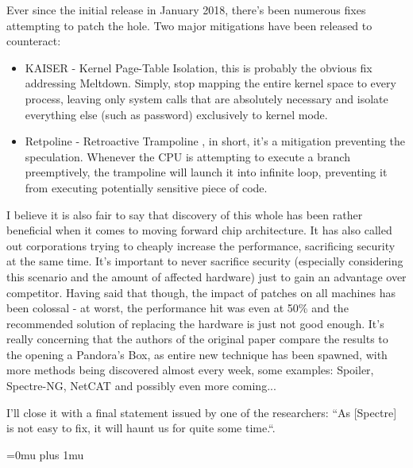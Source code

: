 \documentclass{article}
\begin{document}
Ever since the initial release in January 2018, there's been numerous fixes attempting to patch the hole. Two major mitigations have been released to counteract:
\begin{itemize}
  \item KAISER \cite{lipp2018meltdown} - Kernel Page-Table Isolation, this is probably the obvious fix addressing Meltdown. Simply, stop mapping the entire kernel space to every process, leaving only system calls that are absolutely necessary and isolate everything else (such as password) exclusively to kernel mode.
  \item Retpoline - Retroactive Trampoline \cite{turner2018retpoline}, in short, it's a mitigation preventing the speculation. Whenever the CPU is attempting to execute a branch preemptively, the trampoline will launch it into infinite loop, preventing it from executing potentially sensitive piece of code.
\end{itemize}

I believe it is also fair to say that discovery of this whole has been rather beneficial when it comes to moving forward chip architecture. It has also called out corporations trying to cheaply increase the performance, sacrificing security at the same time. It's important to never sacrifice security (especially considering this scenario and the amount of affected hardware) just to gain an advantage over competitor. Having said that though, the impact of patches on all machines has been colossal - at worst, the performance hit was even at 50\% \cite{prout2018measuring} and the recommended solution of replacing the hardware is just not good enough. It's really concerning that the authors of the original paper compare the results to the opening a Pandora's Box, as entire new technique has been spawned, with more methods being discovered almost every week, some examples: Spoiler, Spectre-NG, NetCAT and possibly even more coming...

I'll close it with a final statement issued by one of the researchers: ``As [Spectre] is not easy to fix, it will haunt us for quite some time.``. 

\Urlmuskip=0mu plus 1mu\relax


 
\end{document}
